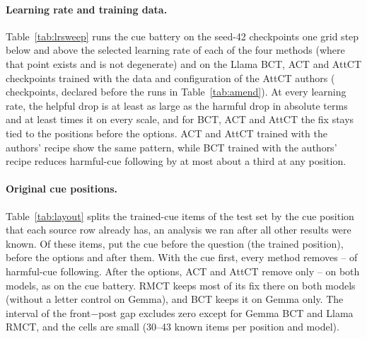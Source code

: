 \documentclass[11pt]{article}
\makeatletter
\newcommand\appflush{\par\if@firstcolumn\else\ifx\@deferlist\@empty\else\ifdim\dimexpr\pagegoal-\pagetotal\relax<0.4\textheight \mbox{}\newpage\fi\fi\fi}
\newcommand{\gemma}{Gemma}\newcommand{\gemmafull}{Gemma-2-2B-it}
\newcommand{\llama}{Llama}\newcommand{\llamafull}{Llama-3.1-8B-Instruct}
\makeatother
\begin{document}
\paragraph{Learning rate and training data.} Table~\ref{tab:lrsweep} runs the cue battery on the seed-42 checkpoints one grid step below and above the selected learning rate of each of the four methods (where that point exists and is not degenerate) and on the \llama{} BCT, ACT and AttCT checkpoints trained with the data and configuration of the AttCT authors (\vSweepN{} checkpoints, declared before the runs in Table~\ref{tab:amend}). At every learning rate, the helpful drop is at least as large as the harmful drop in absolute terms and at least \vSweepRatioMin{} times it on every scale, and for BCT, ACT and AttCT the fix stays tied to the positions before the options. ACT and AttCT trained with the authors' recipe show the same pattern, while BCT trained with the authors' recipe reduces harmful-cue following by at most about a third at any position.

\paragraph{Original cue positions.} Table~\ref{tab:layout} splits the trained-cue items of the test set by the cue position that each source row already has, an analysis we ran after all other results were known. Of these items, \vLayNFront{} put the cue before the question (the trained position), \vLayNPre{} before the options and \vLayNPost{} after them. With the cue first, every method removes \vLayFrontMin--\vLayFrontMax{} of harmful-cue following. After the options, ACT and AttCT remove only \vGemAttctLayPost--\vLlaActLayPost{} on both models, as on the cue battery. RMCT keeps most of its fix there on both models (without a letter control on \gemma), and BCT keeps it on \gemma{} only. The interval of the front$-$post gap excludes zero except for \gemma{} BCT and \llama{} RMCT, and the cells are small (30--43 known items per position and model).

\appflush
\end{document}
